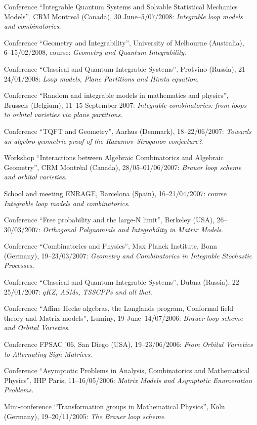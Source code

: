 \s Conference ``Integrable Quantum Systems and Solvable Statistical Mechanics Models'', CRM Montreal (Canada), 30 June--5/07/2008:
{\sl Integrable loop models and combinatorics}.

\s Conference ``Geometry and Integrability'', University of Melbourne (Australia), 6--15/02/2008, course: {\sl Geometry and Quantum Integrability}.

\s Conference ``Classical and Quantum Integrable Systems'', Protvino (Russia), 21--24/01/2008:
{\sl Loop models, Plane Partitions and Hirota equation}.

\s Conference ``Random and integrable models
in mathematics and physics'', Brussels (Belgium), 11--15 September
2007: {\sl Integrable combinatorics: from loops to orbital varieties via plane partitions}.

\s Conference ``TQFT and Geometry'', Aarhus (Denmark), 18--22/06/2007: {\sl Towards an algebro-geometric proof of the Razumov--Stroganov conjecture?}.

\s Workshop ``Interactions between Algebraic Combinatorics and Algebraic Geometry'', CRM Montr\'eal (Canada), 28/05--01/06/2007: {\sl Brauer loop scheme and orbital varieties}.

\s School and meeting ENRAGE, Barcelona (Spain), 16--21/04/2007: course {\sl Integrable
loop models and combinatorics}.

\s Conference ``Free probability and the large-N limit'', Berkeley (USA), 26--30/03/2007: {\sl Orthogonal Polynomials and Integrability in Matrix Models}.

\s Conference ``Combinatorics and Physics'', Max Planck Institute, Bonn (Germany), 19--23/03/2007: {\sl Geometry and Combinatorics in Integrable Stochastic Processes}.

\s Conference ``Classical and Quantum Integrable Systems'', Dubna (Russia), 22--25/01/2007:
{\sl $q$KZ, ASMs, TSSCPPs and all that}.

\s Conference ``Affine Hecke algebras, the Langlands program, Conformal field theory and Matrix models'', Luminy, 19 June--14/07/2006:
{\sl Brauer loop scheme and Orbital Varieties}.

\s Conference FPSAC '06, San Diego (USA), 19--23/06/2006:
{\sl From Orbital Varieties to Alternating Sign Matrices}.

\s Conference ``Asymptotic Problems in Analysis, Combinatorics and Mathematical Physics'', IHP Paris, 11--16/05/2006:
{\sl Matrix Models and Asymptotic Enumeration Problems}.

\s Mini-conference ``Transformation groups in Mathematical Physics'', K\"oln (Germany), 19--20/11/2005: {\sl The Brauer loop scheme}.

